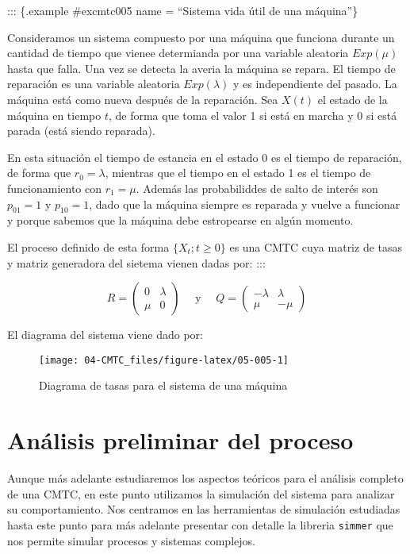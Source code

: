 \documentclass[
]{book}
\theoremstyle{definition}
\theoremstyle{definition}
\theoremstyle{definition}
\theoremstyle{definition}
\theoremstyle{remark}
\begin{document}
::: \{.example \#excmtc005 name = ``Sistema vida útil de una máquina''\}

Consideramos un sistema compuesto por una máquina que funciona durante un cantidad de tiempo que vienee determianda por una variable aleatoria \(Exp(\mu)\) hasta que falla. Una vez se detecta la averia la máquina se repara. El tiempo de reparación es una variable aleatoria \(Exp(\lambda)\) y es independiente del pasado. La máquina está como nueva después de la reparación. Sea \(X(t)\) el estado de la máquina en tiempo \(t\), de forma que toma el valor 1 si está en marcha y 0 si está parada (está siendo reparada).

En esta situación el tiempo de estancia en el estado 0 es el tiempo de reparación, de forma que \(r_0 = \lambda\), mientras que el tiempo en el estado 1 es el tiempo de funcionamiento con \(r_1 = \mu\). Además las probabiliddes de salto de interés son \(p_{01} = 1\) y \(p_{10} = 1\), dado que la máquina siempre es reparada y vuelve a funcionar y porque sabemos que la máquina debe estropearse en algún momento.

El proceso definido de esta forma \(\{X_t; t \geq 0\}\) es una CMTC cuya matriz de tasas y matriz generadora del sietema vienen dadas por:
:::

\[R = 
\begin{pmatrix}
0 & \lambda \\
\mu & 0
\end{pmatrix} \quad \text{ y } \quad Q = 
\begin{pmatrix}
-\lambda & \lambda \\
\mu & -\mu
\end{pmatrix}\]

El diagrama del sistema viene dado por:

\begin{figure}

{\centering \texttt{[image: 04-CMTC\_files/figure-latex/05-005-1]} 

}

\caption{Diagrama de tasas para el sistema de una máquina}\label{fig:05-005}
\end{figure}

\hypertarget{CMTCC}{%
\section{Análisis preliminar del proceso}\label{CMTCC}}

Aunque más adelante estudiaremos los aspectos teóricos para el análisis completo de una CMTC, en este punto utilizamos la simulación del sistema para analizar su comportamiento. Nos centramos en las herramientas de simulación estudiadas hasta este punto para más adelante presentar con detalle la libreria \texttt{simmer} que nos permite simular procesos y sistemas complejos.
\end{document}
